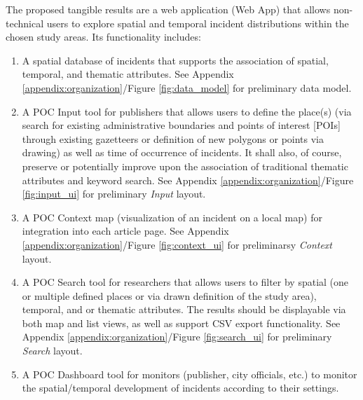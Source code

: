 The proposed tangible results are a web application (Web App) that allows non-technical users to explore spatial and temporal incident distributions within the chosen study areas.  Its functionality includes:
\begin{enumerate}
	\item A spatial database of incidents that supports the association of spatial, temporal, and thematic attributes. See Appendix \ref{appendix:organization}/Figure \ref{fig:data_model} for preliminary data model.
	\item A POC Input tool for publishers that allows users to define the place(s) (via search for existing administrative boundaries and points of interest [POIs] through existing gazetteers or definition of new polygons or points via drawing) as well as time of occurrence of incidents. It shall also, of course, preserve or potentially improve upon the association of traditional thematic attributes and keyword search. See Appendix \ref{appendix:organization}/Figure \ref{fig:input_ui} for preliminary \textit{Input} layout.
	\item A POC Context map (visualization of an incident on a local map) for integration into each article page. See Appendix \ref{appendix:organization}/Figure \ref{fig:context_ui} for preliminarsy \textit{Context} layout.
	\item A POC Search tool for researchers that allows users to filter by spatial (one or multiple defined places or via drawn definition of the study area), temporal, and or thematic attributes. The results should be displayable via both map and list views, as well as support CSV export functionality. See Appendix \ref{appendix:organization}/Figure \ref{fig:search_ui} for preliminary \textit{Search} layout.
	\item A POC Dashboard tool for monitors (publisher, city officials, etc.) to monitor the spatial/temporal development of incidents according to their settings. 
\end{enumerate}

